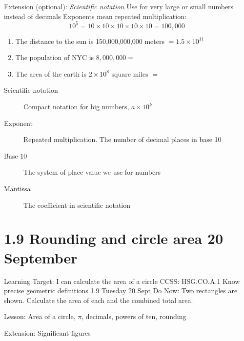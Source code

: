 \begin{frame}{Extension (optional): \emph{Scientific notation}}
    {Use for very large or small numbers instead of decimals}
    Exponents mean repeated multiplication:
        $$10^5 = 10 \times 10 \times 10 \times 10 \times 10 = 100,000$$
    \begin{enumerate}
        \item The distance to the sun is 150,000,000,000 meters $=1.5 \times 10^{11}$
        \item The population of NYC is $8,000,000 = $ \bigskip
        \item The area of the earth is $2 \times 10^{8}$ square miles $=$
    \end{enumerate} \bigskip
    \begin{description}
        \item[Scientific notation] Compact notation for big numbers, $a \times 10^k$
        \item[Exponent] Repeated multiplication. The number of decimal places in base 10
        \item[Base 10] The system of place value we use for numbers
        \item[Mantissa] The coefficient in scientific notation
    \end{description}
    \end{frame}

    
    

\section{1.9 Rounding and circle area \hfill 20 September}
\begin{frame}{Learning Target: I can calculate the area of a circle}
    {CCSS: HSG.CO.A.1 Know precise geometric definitions \hfill \alert{1.9 Tuesday 20 Sept}}
        Do Now: Two rectangles are shown. Calculate the area of each and the combined total area.
        \begin{flushleft}
          \end{flushleft}
        Lesson: Area of a circle, $\pi$, decimals, powers of ten, rounding \par \medskip
        Extension: Significant figures
    \end{frame}

